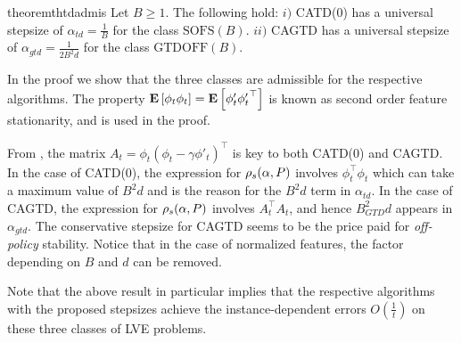 \begin{table}[h]
\caption{Here, $S,A,\gamma$ are fixed across all the class and the second column shows the quantities that vary across the respective classes. These three capture \emph{on/off-policy} learning scenarios arising in RL.}
\end{table}
\fi
\begin{restatable}{theorem}{thtdadmis}\label{th:tdadmis}
Let $B\ge 1$.
The following hold:
$i)$ CATD(0) has a universal stepsize of $\alpha_{td}=\frac{1}{B}$ for  the class $\text{SOFS}(B)$.
$ii)$ CAGTD has a universal stepsize of $\alpha_{gtd}=\frac{1}{2B^2 d}$ for the class $\text{GTDOFF}(B)$.
\end{restatable}
In the proof we show that the three classes are admissible for the respective algorithms.
The property $\mathbf{E}\left[\phi_t\phi_t\right]=\mathbf{E}\left[\phi'_t{\phi'_t}^\top\right]$ is known as second order feature stationarity, and is used in the proof.
\fi

From , the matrix $A_t=\phi_t(\phi_t-\gamma\phi'_t)^\top$ is key to both CATD(0) and CAGTD. In the case of CATD(0),  the expression for $\rho_s(\alpha,P)$ involves $\phi^\top_t\phi_t$ which can take a maximum value of $B^2d$  and is the reason for the $B^2d$ term in $\alpha_{td}$. In the case of CAGTD, the expression for $\rho_s(\alpha,P)$ involves $A_t^\top A_t$, and hence $B^2_{GTD}d$ appears in $\alpha_{gtd}$. 
The conservative stepsize for CAGTD seems to be the price paid for \emph{off-policy} stability. Notice that in the case of normalized features, the factor depending on $B$ and $d$ can be removed.

Note that the above result in particular implies that the respective algorithms with the proposed stepsizes achieve the instance-dependent errors $O(\frac{1}{t})$ on these three classes of LVE problems.

